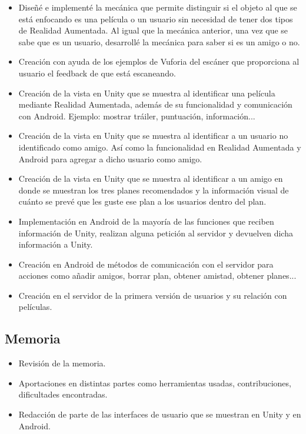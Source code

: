 \begin{itemize}
                    \item Diseñé e implementé la mecánica que permite distinguir si el objeto al que se está enfocando es una película o un usuario sin necesidad de 
                    tener dos tipos de Realidad Aumentada. Al igual que la mecánica anterior, una vez que se sabe que es un usuario, desarrollé la mecánica para saber si es un amigo o no.
                    \item Creación con ayuda de los ejemplos de Vuforia del escáner que proporciona al usuario el feedback de que está escaneando.
                    \item Creación de la vista en Unity que se muestra al identificar una película mediante Realidad Aumentada, además de su funcionalidad y comunicación 
                    con Android. Ejemplo: mostrar tráiler, puntuación, información...
                    \item Creación de la vista en Unity que se muestra al identificar a un usuario no identificado como amigo. Así como la funcionalidad en Realidad Aumentada 
                    y Android para agregar a dicho usuario como amigo.
                    \item Creación de la vista en Unity que se muestra al identificar a un amigo en donde se muestran los tres planes recomendados y la información visual de cuánto 
                    se prevé que les guste ese plan a los usuarios dentro del plan.
                    \item Implementación en Android de la mayoría de las funciones que reciben información de Unity, realizan alguna petición al servidor y devuelven dicha información a Unity.
                    \item Creación en Android de métodos de comunicación con el servidor para acciones como añadir amigos, borrar plan, obtener amistad, obtener planes...
                    \item Creación en el servidor de la primera versión de usuarios y su relación con películas.
                \end{itemize}
            \subsection{Memoria}
            \label{makereference7.3.3}
                \begin{itemize}
                    \item Revisión de la memoria.
                    \item Aportaciones en distintas partes como herramientas usadas, contribuciones, dificultades encontradas.
                    \item Redacción de parte de las interfaces de usuario que se muestran en Unity y en Android.
                \end{itemize}
        
